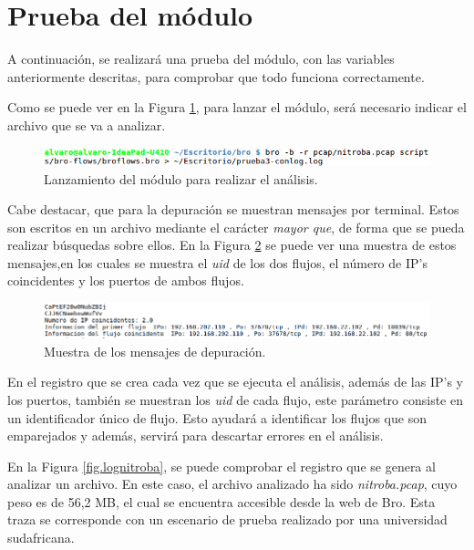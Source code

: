 \section{Prueba del módulo}

A continuación, se realizará una prueba del módulo, con las variables anteriormente descritas, para comprobar que todo funciona 
correctamente.

\intro Como se puede ver en la Figura \ref{fig.terminal}, para lanzar el módulo, será necesario indicar el archivo que se va a 
analizar.

\begin{figure}[H]
  \includegraphics[width=1\textwidth]{imagenes/terminal.png}
  \centering
  \caption{Lanzamiento del módulo para realizar el análisis.}\label{fig.terminal}
\end{figure}

\intro Cabe destacar, que para la depuración se muestran mensajes por terminal. Estos son escritos en un archivo mediante el carácter \textit{mayor que}, de forma que se pueda realizar búsquedas sobre ellos. En la Figura \ref{fig.salida} se puede ver una muestra de estos mensajes,en los cuales se muestra el \textit{uid} de los dos flujos, el número de IP's coincidentes y los puertos de ambos flujos.

\begin{figure}[H]
  \includegraphics[width=1\textwidth]{imagenes/salida.png}
  \centering
  \caption{Muestra de los mensajes de depuración.}\label{fig.salida}
\end{figure}

\intro En el registro que se crea cada vez que se ejecuta el análisis, además de las IP's y los puertos, también se muestran los 
\textit{uid} de cada flujo, este parámetro consiste en un identificador único de flujo. Esto ayudará a identificar los flujos que son 
emparejados y además, servirá para descartar errores en el análisis.

\intro En la Figura \ref{fig.lognitroba}, se puede comprobar el registro que se genera al analizar un archivo. En este caso, el 
archivo analizado ha sido \textit{nitroba.pcap}, cuyo peso es de 56,2 MB, el cual se encuentra accesible desde la web de Bro. Esta 
traza se corresponde con un escenario de prueba realizado por una universidad sudafricana. 

